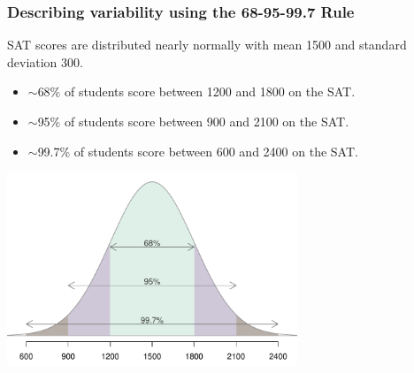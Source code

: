 \begin{frame}
\frametitle{Describing variability using the 68-95-99.7 Rule}

SAT scores are distributed nearly normally with mean 1500 and standard deviation 300.

\pause
\begin{itemize}

\item $\sim$68\% of students score between 1200 and 1800 on the SAT. 

\item $\sim$95\% of students score between 900 and 2100 on the SAT. 

\item $\sim$99.7\% of students score between 600 and 2400 on the SAT. 

\end{itemize}

\begin{center}
\includegraphics[width=0.65\textwidth]{4-1_normal_distribution/figures/sat_empirical/sat_empirical}
\end{center}

\end{frame}


